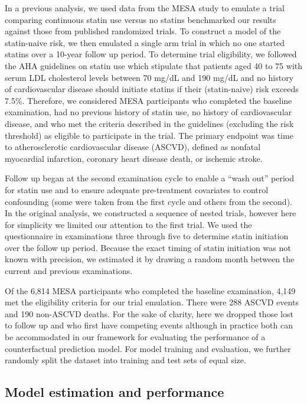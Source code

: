 In a previous analysis, we used data from the MESA study to emulate a trial comparing continuous statin use versus no statins benchmarked our results against those from published randomized trials. To construct a model of the statin-naive risk, we then emulated a single arm trial in which no one started statins over a 10-year follow up period. To determine trial eligibility, we followed the AHA guidelines \cite{grundy_scott_m_2018_2019} on statin use which stipulate that patients aged 40 to 75 with serum LDL cholesterol levels between 70 mg/dL and 190 mg/dL and no history of cardiovascular disease should initiate statins if their (statin-naive) risk exceeds 7.5\%. Therefore, we considered MESA participants who completed the baseline examination, had no previous history of statin use, no history of cardiovascular disease, and who met the criteria described in the guidelines (excluding the risk threshold) as eligible to participate in the trial. The primary endpoint was time to atherosclerotic cardiovascular disease (ASCVD), defined as nonfatal myocardial infarction, coronary heart disease death, or ischemic stroke. 

Follow up began at the second examination cycle to enable a ``wash out'' period for statin use and to ensure adequate pre-treatment covariates to control confounding (some were taken from the first cycle and others from the second). In the original analysis, we constructed a sequence of nested trials, however here for simplicity we limited our attention to the first trial. We used the questionnaire in examinations three through five to determine statin initiation over the follow up period. Because the exact timing of statin initiation was not known with precision, we estimated it by drawing a random month between the current and previous examinations. 

Of the 6,814 MESA participants who completed the baseline examination, 4,149 met the eligibility criteria for our trial emulation. There were 288 ASCVD events and 190 non-ASCVD deaths. For the sake of clarity, here we dropped those lost to follow up and who first have competing events although in practice both can be accommodated in our framework for evaluating the performance of a counterfactual prediction model. For model training and evaluation, we further randomly split the dataset into training and test sets of equal size. 

\subsection{Model estimation and performance}

